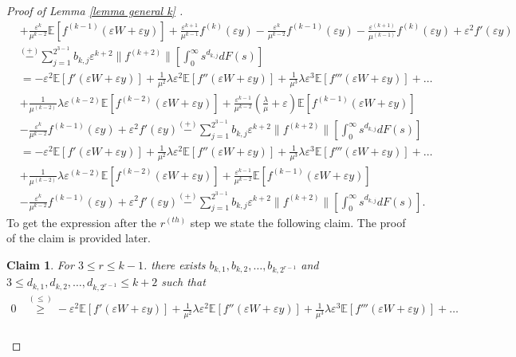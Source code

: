 \documentclass[11pt,letterpaper,reqno]{article}
\theoremstyle{thmstyleone}%
\theoremstyle{thmstyletwo}%
\newtheorem{claim}{Claim}
\theoremstyle{thmstylethree}%
\numberwithin{equation}{section}
\begin{document}
\begin{proof}[Proof of Lemma \ref{lemma general k} ]
\begin{align}
 &+\frac{\varepsilon^k}{\mu^{k-2}} \mathbb E[f^{(k-1)}(\varepsilon W+\varepsilon y)]+\frac{\varepsilon^{k+1}}{\mu^{k-1}} f^{(k)}(\varepsilon y)-\frac{\varepsilon^k}{\mu^{k-2}}f^{(k-1)}(\varepsilon y)-\frac{\varepsilon^{(k+1)}}{\mu^{(k-1)}}f^{(k)}(\varepsilon y)+\varepsilon^2 f'(\varepsilon y) \nonumber\\
&\stackrel{(+)}{-}\sum_{j=1}^{2^{3-1}}b_{k,j} \varepsilon^{k+2} \|f^{(k+2)}\| \left[ \int_0^\infty s^{d_{k,j}} dF(s)\right] \nonumber \\
&=-\varepsilon^2\mathbb E[f'(\varepsilon W+\varepsilon y)]+\frac{1}{\mu^2}\lambda \varepsilon^2 \mathbb E[f''(\varepsilon W+\varepsilon y)]+\frac{1}{\mu^3}\lambda \varepsilon^3 \mathbb E[f'''(\varepsilon W+\varepsilon y)]+ \ldots \nonumber\\
&+\frac{1}{\mu^{(k-2)}}\lambda \varepsilon^{(k-2)}\mathbb E[f^{(k-2)}(\varepsilon W+\varepsilon y)]+\frac{\varepsilon^{k-1}}{\mu^{k-2}}\left( \frac{\lambda}{\mu}+\varepsilon\right)\mathbb E[f^{(k-1)}(\varepsilon W+\varepsilon y)] \nonumber \\
&-\frac{\varepsilon^k}{\mu^{k-2}}f^{(k-1)}(\varepsilon y)+\varepsilon^2 f'(\varepsilon y)\stackrel{(+)}{-}\sum_{j=1}^{2^{3-1}}b_{k,j} \varepsilon^{k+2} \|f^{(k+2)}\|\left[ \int_0^\infty s^{d_{k,j}} dF(s)\right] \nonumber \\
&=-\varepsilon^2\mathbb E[f'(\varepsilon W+\varepsilon y)]+\frac{1}{\mu^2}\lambda \varepsilon^2 \mathbb E[f''(\varepsilon W+\varepsilon y)]+\frac{1}{\mu^3}\lambda \varepsilon^3 \mathbb E[f'''(\varepsilon W+\varepsilon y)]+ \ldots \nonumber\\
&+\frac{1}{\mu^{(k-2)}}\lambda \varepsilon^{(k-2)}\mathbb E[f^{(k-2)}(\varepsilon W+\varepsilon y)]+\frac{\varepsilon^{k-1}}{\mu^{k-2}}\mathbb E[f^{(k-1)}(\varepsilon W+\varepsilon y)] \nonumber\\
&-\frac{\varepsilon^k}{\mu^{k-2}}f^{(k-1)}(\varepsilon y)+\varepsilon^2 f'(\varepsilon y)\stackrel{(+)}{-}\sum_{j=1}^{2^{3-1}}b_{k,j} \varepsilon^{k+2} \|f^{(k+2)}\| \left[ \int_0^\infty s^{d_{k,j}} dF(s)\right]  .
\end{align}
To get the expression after the $r^{(th)}$ step we state the following claim. The proof of the claim is provided later. 
\begin{claim}\label{claim1}
For $3 \leq r \leq k-1$. there exists $b_{k,1},b_{k,2}, \ldots, b_{k,2^{r-1}}$ and $3 \leq d_{k,1},d_{k,2}, \ldots, d_{k,2^{r-1}} \leq k+2$ such that 
\begin{align}\label{stg26}
    0 &\stackrel{(\leq)} {\geq} -\varepsilon^2\mathbb E[f'(\varepsilon W+\varepsilon y)]+\frac{1}{\mu^2}\lambda \varepsilon^2 \mathbb E[f''(\varepsilon W+\varepsilon y)]+\frac{1}{\mu^3}\lambda \varepsilon^3 \mathbb E[f'''(\varepsilon W+\varepsilon y)]+ \ldots \nonumber\\

\end{align}
\end{claim}
\end{proof}
\end{document}
